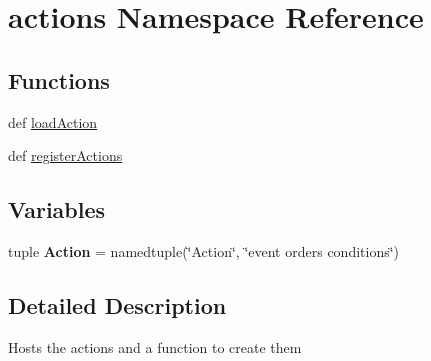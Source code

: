 \hypertarget{namespaceactions}{\section{actions \-Namespace \-Reference}
\label{namespaceactions}
}
\subsection*{\-Functions}
\begin{DoxyCompactItemize}
\item 
def \hyperlink{namespaceactions_a2b7c4bfbef07daa3236dcd17e587c29e}{load\-Action}
\item 
def \hyperlink{namespaceactions_a9226d73b68a0e8a3998ab9f0fbceb3da}{register\-Actions}
\end{DoxyCompactItemize}
\subsection*{\-Variables}
\begin{DoxyCompactItemize}
\item 
\hypertarget{namespaceactions_a76ea39ba78dd4f848c45d3e5d52eb456}{tuple {\bfseries \-Action} = namedtuple(\char`\"{}\-Action\char`\"{}, \char`\"{}event orders conditions\char`\"{})}\label{namespaceactions_a76ea39ba78dd4f848c45d3e5d52eb456}

\end{DoxyCompactItemize}


\subsection{\-Detailed \-Description}
\begin{DoxyVerb}Hosts the actions and a function to create them \end{DoxyVerb}
 

